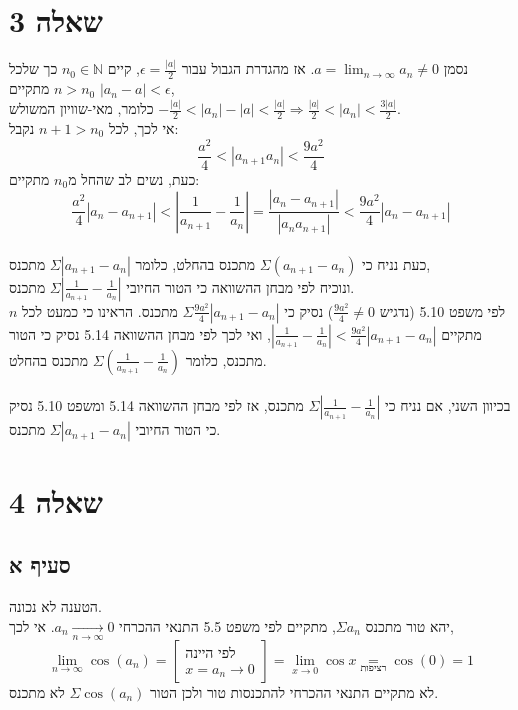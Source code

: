\documentclass{article}
\newcommand\underrel[2]{\mathrel{\mathop{#2}\limits_{#1}}}
\begin{document}
\section*{שאלה 3}

נסמן $a=\lim_{n\rightarrow\infty}a_n\ne 0$.
אז מהגדרת הגבול עבור $\epsilon=\frac{|a|}{2}$,
קיים $n_0\in \mathbb{N}$ כך שלכל $n>n_0$ מתקיים $|a_n-a|<\epsilon$, \\
כלומר, מאי-שוויון המשולש $-\frac{|a|}{2}<|a_n|-|a|<\frac{|a|}{2}\Rightarrow \frac{|a|}{2}<|a_n|<\frac{3|a|}{2}$. \\
אי לכך, לכל $n+1>n_0$ נקבל:
\[
    \frac{a^2}{4}<|a_{n+1}a_n|<\frac{9a^2}{4}
\]
כעת, נשים לב שהחל מ$n_0$ מתקיים:
\[
    \frac{a^2}{4}|a_n-a_{n+1}|<
    |\frac{1}{a_{n+1}}-\frac{1}{a_n}|=
    \frac{|a_n-a_{n+1}|}{|a_na_{n+1}|}<
    \frac{9a^2}{4}|a_n-a_{n+1}|
\]
\\
כעת נניח כי $\Sigma (a_{n+1}-a_{n})$ מתכנס בהחלט, כלומר
$\Sigma|a_{n+1}-a_n|$ מתכנס,\\
ונוכיח לפי מבחן ההשוואה כי הטור החיובי $\Sigma |\frac{1}{a_{n+1}}-\frac{1}{a_n}|$ מתכנס.\\
לפי משפט 5.10 (נדגיש $\frac{9a^2}{4}\ne 0$) נסיק כי $\Sigma \frac{9a^2}{4}|a_{n+1}-a_n|$ מתכנס.
הראינו כי כמעט לכל $n$ מתקיים $|\frac{1}{a_{n+1}}-\frac{1}{a_n}|<\frac{9a^2}{4}|a_{n+1}-a_n|$,
ואי לכך לפי מבחן ההשוואה 5.14 נסיק כי הטור מתכנס, כלומר $\Sigma(\frac{1}{a_{n+1}}-\frac{1}{a_n})$ מתכנס בהחלט.
\\\\
בכיוון השני, אם נניח כי $\Sigma |\frac{1}{a_{n+1}}-\frac{1}{a_n}|$ מתכנס,
אז לפי מבחן ההשוואה 5.14 ומשפט 5.10 נסיק כי הטור החיובי $\Sigma |a_{n+1}-a_n|$ מתכנס.

\pagebreak

\section*{שאלה 4}

\subsection*{סעיף א}

הטענה לא נכונה. \\
יהא טור מתכנס $\Sigma a_n$,
מתקיים לפי משפט 5.5 התנאי ההכרחי $a_n\xrightarrow[n\rightarrow\infty]{}0$. אי לכך,
\[
    \lim_{n\rightarrow\infty}\cos(a_n)=
    \begin{bmatrix}
        \text{לפי היינה} \\
        x=a_n\rightarrow 0
    \end{bmatrix} =
    \lim_{x\rightarrow 0} \cos x \underrel{\text{רציפות}}{=}
    \cos(0)=1
\]
לא מתקיים התנאי ההכרחי להתכנסות טור ולכן הטור $\Sigma \cos(a_n)$ לא מתכנס.
\end{document}
